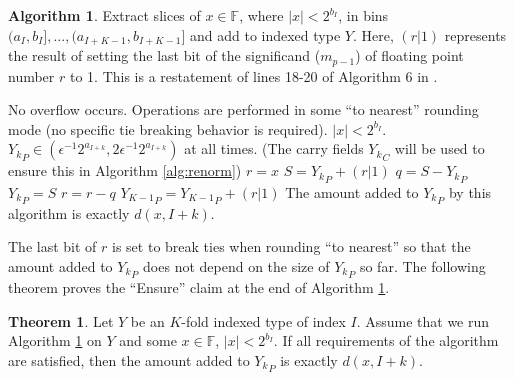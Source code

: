 \documentclass[12pt]{article}
\providecommand{\F}{\ensuremath{\mathbb{F}}}
\providecommand{\To}{\ensuremath{\text{ to }}}
\theoremstyle{definition}
\newtheorem{thm}{Theorem}[section]
\newtheorem{alg}{Algorithm}[section]
\numberwithin{equation}{section}
\numberwithin{figure}{section}
\begin{document}
      \begin{samepage}
      \begin{alg}
        Extract slices of $x \in \F$, where $|x| < 2^{b_I}$, in bins $(a_I, b_I], ..., (a_{I + K - 1}, b_{I + K - 1}]$ and add to indexed type $Y$. Here, $(r | 1)$ represents the result of setting the last bit of the significand ($m_{p - 1}$) of floating point number $r$ to 1. This is a restatement of lines 18-20 of Algorithm $6$ in \cite{repsum}.
        \begin{algorithmic}[1]
          \Require
          \Statex No overflow occurs.
          \Statex Operations are performed in some ``to nearest'' rounding mode (no specific tie breaking behavior is required).
          \Statex $|x| < 2^{b_I}$.
          \Statex ${Y_k}_P \in (\epsilon^{-1}  2^{a_{I + k}}, 2  \epsilon^{-1}  2^{a_{I + k}})$ at all times. (The carry fields ${Y_k}_C$ will be used to ensure this in Algorithm \ref{alg:renorm})
            \State $r = x$ \label{alg:depositrestricted:rgetsx}
            \For{$k = 0 \To (K - 2)$} \label{alg:depositrestricted:loop}
              \State $S = {Y_k}_P + (r | 1)$ \label{alg:depositrestricted:split}
              \State $q = S - {Y_k}_P$
              \State ${Y_k}_P = S$
              \State $r = r - q$\label{alg:depositrestricted:endsplit}
            \EndFor
            \State ${Y_{K - 1}}_P = {Y_{K - 1}}_P + (r | 1)$
          \EndFunction
          \Ensure
          \Statex The amount added to ${Y_k}_P$ by this algorithm is exactly $d(x, I + k)$.
        \end{algorithmic}
        \label{alg:depositrestricted}
      \end{alg}
      \end{samepage}

      The last bit of $r$ is set to break ties when rounding ``to nearest'' so that the amount added to ${Y_k}_P$ does not depend on the size of ${Y_k}_P$ so far. The following theorem proves the ``Ensure'' claim at the end of Algorithm \ref{alg:depositrestricted}.

    \begin{samepage}
      \begin{thm}
        Let $Y$ be an $K$-fold indexed type of index $I$. Assume that we run Algorithm \ref{alg:depositrestricted} on $Y$ and some $x \in \F$, $|x| < 2^{b_I}$. If all requirements of the algorithm are satisfied, then the amount added to ${Y_k}_P$ is exactly $d(x, I + k)$.
        \label{thm:ddepositrestricted}
      \end{thm}
    \end{samepage}
\end{document}
